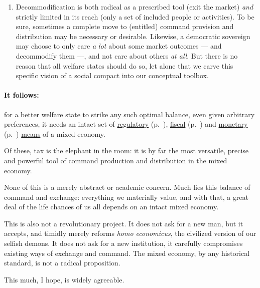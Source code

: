 \begin{description}
\begin{enumerate}
		\item Decommodification is both radical as a prescribed tool (exit the market) \emph{and} strictly limited in its reach (only a set of included people or activities). To be sure, sometimes a complete move to (entitled) command provision and distribution may be necessary or desirable. Likewise, a democratic sovereign may choose to only care \emph{a lot} about some market outcomes --- and decommodify them ---, and not care about others \emph{at all}. But there is no reason that all welfare states should do so, let alone that we carve this specific vision of a social compact into our conceptual toolbox.
	\end{enumerate}
\end{description} 

\paragraph{It follows:} for a better welfare state to strike any such optimal balance, even given arbitrary preferences, it needs an intact set of \hyperref[sec:regulatory]{regulatory} (p.~\pageref{sec:regulatory}), \hyperref[sec:fiscal] {fiscal} (p.~\pageref{sec:fiscal}) and \hyperref[sec:monetary]{monetary} (p.~\pageref{sec:monetary}) \hyperref[sec:means]{means} of a mixed economy. %

Of these, tax is the elephant in the room: it is by far the most versatile, precise and powerful tool of command production and distribution in the mixed economy.

None of this is a merely abstract or academic concern. Much lies this balance of command and exchange: everything we materially value, and with that, a great deal of the life chances of us all depends on an intact mixed economy.

This is also not a revolutionary project. It does not ask for a new man, but it accepts, and timidly merely reforms \emph{homo economicus}, the civilized version of our selfish demons. It does not ask for a new institution, it carefully compromises existing ways of exchange and command. The mixed economy, by any historical standard, is not a radical proposition. 

This much, I hope, is widely agreeable.